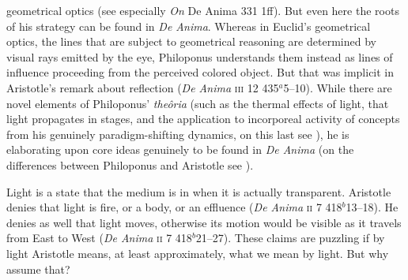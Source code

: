 geometrical optics (see especially \emph{On} De Anima 331 1ff). But even here the roots of his strategy can be found in \emph{De Anima}. Whereas in Euclid's geometrical optics, the lines that are subject to geometrical reasoning are determined by visual rays emitted by the eye, Philoponus understands them instead as lines of influence proceeding from the perceived colored object. But that was implicit in Aristotle's remark about reflection (\emph{De Anima} \textsc{iii} 12 435\( ^{a} \)5--10). While there are novel elements of Philoponus' \emph{theôria} (such as the thermal effects of light, that light propagates in stages, and the application to incorporeal activity of concepts from his genuinely paradigm-shifting dynamics, on this last see \citealt{Kuhn:1962ss,Wolff:1987vn}), he is elaborating upon core ideas genuinely to be found in \emph{De Anima} (on the differences between Philoponus and Aristotle see \citealt{Groot:1983fa}).

Light is a state that the medium is in when it is actually transparent. Aristotle denies that light is fire, or a body, or an effluence (\emph{De Anima} \textsc{ii} 7 418\( ^{b} \)13--18). He denies as well that light moves, otherwise its motion would be visible as it travels from East to West (\emph{De Anima} \textsc{ii} 7 418\( ^{b} \)21--27). These claims are puzzling if by light Aristotle means, at least approximately, what we mean by light. But why assume that? 

